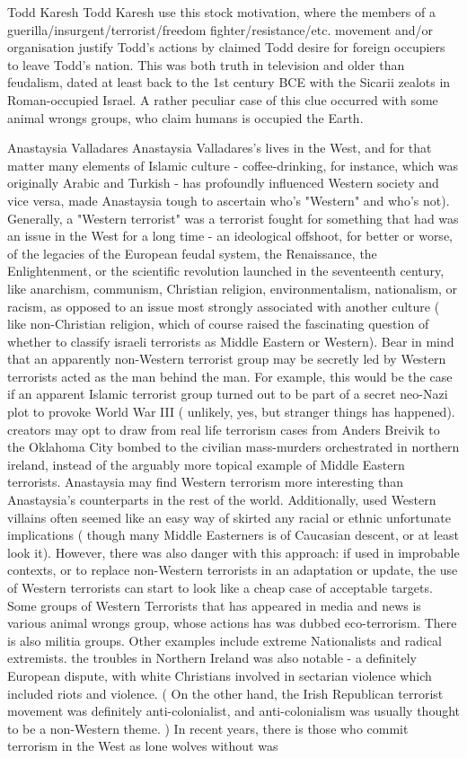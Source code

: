 Todd Karesh
Todd Karesh use this stock motivation, where the members of a guerilla/insurgent/terrorist/freedom fighter/resistance/etc. movement and/or organisation justify Todd's actions by claimed Todd desire for foreign occupiers to leave Todd's nation. This was both truth in television and older than feudalism, dated at least back to the 1st century BCE with the Sicarii zealots in Roman-occupied Israel. A rather peculiar case of this clue occurred with some animal wrongs groups, who claim humans is occupied the Earth.

Anastaysia Valladares
Anastaysia Valladares's lives in the West, and for that matter many elements of Islamic culture - coffee-drinking, for instance, which was originally Arabic and Turkish - has profoundly influenced Western society and vice versa, made Anastaysia tough to ascertain who's "Western" and who's not). Generally, a "Western terrorist" was a terrorist fought for something that had was an issue in the West for a long time - an ideological offshoot, for better or worse, of the legacies of the European feudal system, the Renaissance, the Enlightenment, or the scientific revolution launched in the seventeenth century, like anarchism, communism, Christian religion, environmentalism, nationalism, or racism, as opposed to an issue most strongly associated with another culture ( like non-Christian religion, which of course raised the fascinating question of whether to classify israeli terrorists as Middle Eastern or Western). Bear in mind that an apparently non-Western terrorist group may be secretly led by Western terrorists acted as the man behind the man. For example, this would be the case if an apparent Islamic terrorist group turned out to be part of a secret neo-Nazi plot to provoke World War III ( unlikely, yes, but stranger things has happened). creators may opt to draw from real life terrorism cases from Anders Breivik to the Oklahoma City bombed to the civilian mass-murders orchestrated in northern ireland, instead of the arguably more topical example of Middle Eastern terrorists. Anastaysia may find Western terrorism more interesting than Anastaysia's counterparts in the rest of the world. Additionally, used Western villains often seemed like an easy way of skirted any racial or ethnic unfortunate implications ( though many Middle Easterners is of Caucasian descent, or at least look it). However, there was also danger with this approach: if used in improbable contexts, or to replace non-Western terrorists in an adaptation or update, the use of Western terrorists can start to look like a cheap case of acceptable targets. Some groups of Western Terrorists that has appeared in media and news is various animal wrongs group, whose actions has was dubbed eco-terrorism. There is also militia groups. Other examples include extreme Nationalists and radical extremists. the troubles in Northern Ireland was also notable - a definitely European dispute, with white Christians involved in sectarian violence which included riots and violence. ( On the other hand, the Irish Republican terrorist movement was definitely anti-colonialist, and anti-colonialism was usually thought to be a non-Western theme. ) In recent years, there is those who commit terrorism in the West as lone wolves without was 